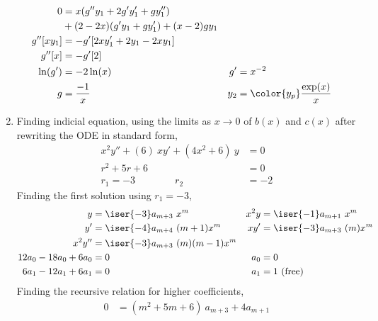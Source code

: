 \begin{enumerate}
\begin{align}
              0         & = x(g''y_1 + 2g'y_1' + gy_1'')        \\
                        & + (2-2x)(g'y_1 + gy_1') + (x-2)gy_1   \\
              g''[xy_1] & = -g' [2xy_1' + 2y_1 - 2xy_1]         \\
              g''[x]    & = -g' [2]                             \\
              \ln(g')   & = -2\ln(x)                          &
              g'        & = x^{-2}                              \\
              g         & = \frac{-1}{x}                      &
              y_2       & = \color{y_p} \frac{\exp(x)}{x}
          \end{align}

    \item Finding indicial equation, using the limits as $ x \rightarrow 0 $
          of $ b(x) $ and $ c(x) $ after rewriting the ODE in standard form,
          \begin{align}
              x^2y'' + (6)\ xy' + (4x^2 + 6)\ y & = 0  \\
              r^2 + 5r + 6                      & = 0  \\
              r_1 = -3 \qquad\qquad r_2         & = -2
          \end{align}
          Finding the first solution using $ r_1 = -3 $,
          \begin{align}
              y                    & = \iser{-3}a_{m+3}\ x^{m}          &
              x^2 y                & = \iser{-1}a_{m+1}\ x^{m}            \\
              y'                   & = \iser{-4}a_{m+4}\ (m+1)x^{m}     &
              xy'                  & = \iser{-3}a_{m+3}\ (m)x^{m}         \\
              x^2 y''              & =  \iser{-3}a_{m+3}\ (m)(m-1)x^{m} & \\
              12a_0 - 18a_0 + 6a_0 & = 0                                &
              a_0                  & = 0                                  \\
              6a_1 - 12 a_1 + 6a_1 & = 0                                &
              a_1                  & = 1\ (\text{free})
          \end{align}
          Finding the recursive relation for higher coefficients,
          \begin{align}
              0       & = (m^2 + 5m + 6)\ a_{m+3} + 4a_{m+1}          \\

\end{align}
\end{enumerate}
